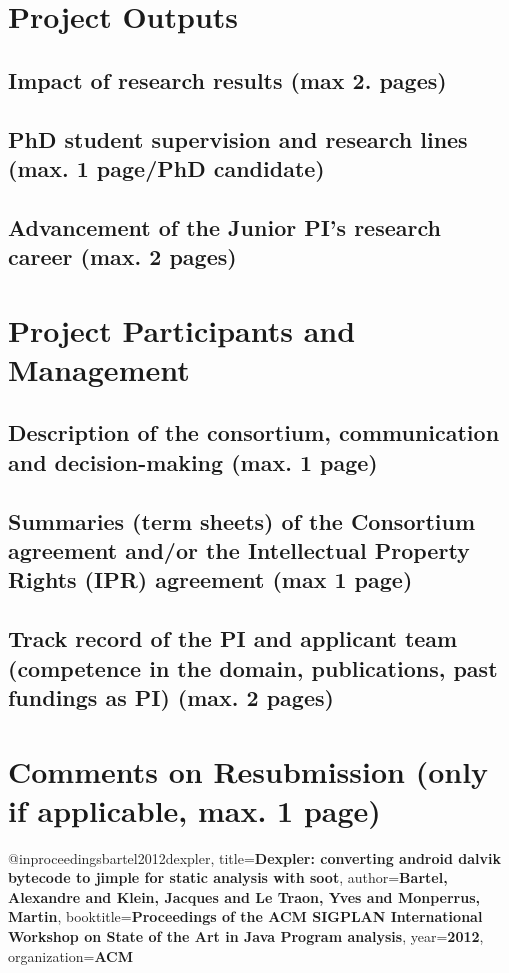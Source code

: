 \documentclass[a4paper, 11pt]{article}
\begin{document}
\newpage
\section{Project Outputs}
\subsection{Impact of research results (max 2. pages)}

\subsection{PhD student supervision and research lines (max. 1 page/PhD candidate)}

\subsection{Advancement of the Junior PI’s research career (max. 2 pages)}

\newpage
\section{Project Participants and Management}
\subsection{Description of the consortium, communication and decision-making (max. 1 page)}
\subsection{Summaries (term sheets) of the Consortium agreement and/or the Intellectual Property Rights (IPR) agreement (max 1 page)}
\subsection{Track record of the PI and applicant team (competence in the domain, publications, past fundings as PI) (max. 2 pages)}

\newpage
\section{Comments on Resubmission (only if applicable, max. 1 page)}

\newpage

@inproceedings{bartel2012dexpler,
  title={{\bf Dexpler: converting android dalvik bytecode to jimple for static analysis with soot}},
  author={{\bf Bartel, Alexandre and Klein, Jacques and Le Traon, Yves and Monperrus, Martin}},
  booktitle={{\bf Proceedings of the ACM SIGPLAN International Workshop on State of the Art in Java Program analysis}},
  year={{\bf 2012}},
  organization={{\bf ACM}}
}
\end{document}

